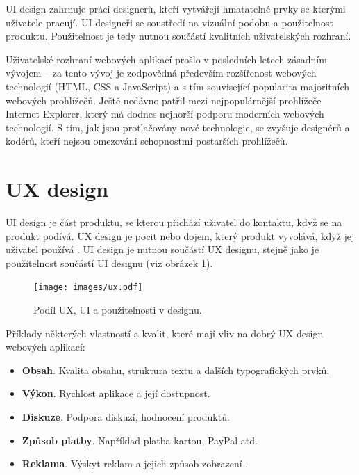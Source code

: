 UI design zahrnuje práci designerů, kteří vytvářejí hmatatelné prvky se kterými uživatele pracují. UI designeři se soustředí na vizuální podobu a použitelnost produktu. Použitelnost je tedy nutnou součástí kvalitních uživatelských rozhraní.

Uživatelské rozhraní webových aplikací prošlo v posledních letech zásadním vývojem -- za tento vývoj je zodpovědná především rozšířenost webových technologií (HTML, CSS a JavaScript) a s tím související popularita majoritních webových prohlížečů. Ještě nedávno patřil mezi nejpopulárnější prohlížeče Internet Explorer, který má dodnes nejhorší podporu moderních webových technologií. S tím, jak jsou protlačovány nové technologie, se zvyšuje  designérů a kodérů, kteří nejsou omezováni schopnostmi postarších prohlížečů.

\section{UX design}
\label{sec:uxdesign}

UI design je část produktu, se kterou přichází uživatel do kontaktu, když se na produkt podívá. UX design je pocit nebo dojem, který produkt vyvolává, když jej uživatel používá \cite{3}. UI design je nutnou součástí UX designu, stejně jako je použitelnost součástí UI designu (viz obrázek \ref{fig:ux-ui-usability}).

\begin{figure}[htbp]
    \centering
    \texttt{[image: images/ux.pdf]}
    \caption{Podíl UX, UI a použitelnosti v designu.}
    \label{fig:ux-ui-usability}
\end{figure}

Příklady některých vlastností a kvalit, které mají vliv na dobrý UX design webových aplikací:

\begin{itemize}
    \item \textbf{Obsah}. Kvalita obsahu, struktura textu a dalších typografických prvků.
    \item \textbf{Výkon}. Rychlost aplikace a její dostupnost.
    \item \textbf{Diskuze}. Podpora diskuzí, hodnocení produktů.
    \item \textbf{Způsob platby}. Například platba kartou, PayPal atd.
    \item \textbf{Reklama}. Výskyt reklam a jejich způsob zobrazení \cite{4}.
\end{itemize}

